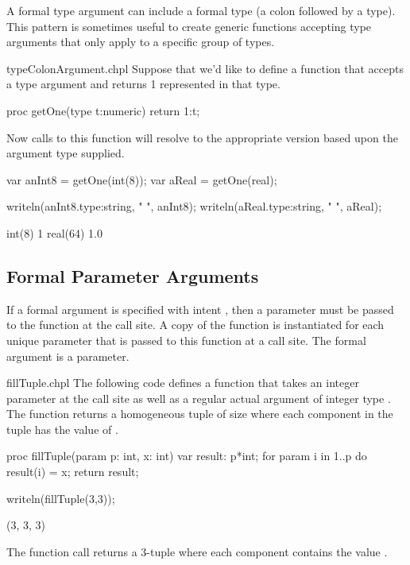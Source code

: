 A formal type argument can include a formal type (a colon followed by a
type). This pattern is sometimes useful to create generic functions
accepting type arguments that only apply to a specific group of types.

\begin{chapelexample}{typeColonArgument.chpl}
Suppose that we'd like to define a function that accepts a type argument
and returns 1 represented in that type.
\begin{chapel}
proc getOne(type t:numeric) {
  return 1:t;
}
\end{chapel}
Now calls to this function will resolve to the appropriate version based
upon the argument type supplied.
\begin{chapel}
var anInt8 = getOne(int(8));
var aReal = getOne(real);
\end{chapel}
\begin{chapelpost}
writeln(anInt8.type:string, " ", anInt8);
writeln(aReal.type:string, " ", aReal);
\end{chapelpost}
\begin{chapeloutput}
int(8) 1
real(64) 1.0
\end{chapeloutput}
\end{chapelexample}


\subsection{Formal Parameter Arguments}
\label{Formal_Parameter_Arguments}

If a formal argument is specified with intent , then a
parameter must be passed to the function at the call site.  A copy of
the function is instantiated for each unique parameter that is passed
to this function at a call site.  The formal argument is a parameter.
\begin{chapelexample}{fillTuple.chpl}
The following code defines a function that takes an integer parameter
 at the call site as well as a regular actual argument of
integer type .  The function returns a homogeneous tuple of
size  where each component in the tuple has the value of
.
\begin{chapel}
proc fillTuple(param p: int, x: int) {
  var result: p*int;
  for param i in 1..p do
    result(i) = x;
  return result;
}
\end{chapel}
\begin{chapelpost}
writeln(fillTuple(3,3));
\end{chapelpost}
\begin{chapeloutput}
(3, 3, 3)
\end{chapeloutput}
The function call  returns a 3-tuple where each
component contains the value .
\end{chapelexample}

